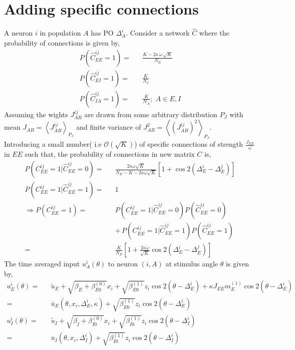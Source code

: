 \documentclass[a4paper]{article}
\date{}
\begin{document}
\section*{Adding specific connections}
A neuron $i$ in population $A$ has PO $\Delta_A^i$. 
Consider a network $\hat{C} $ where the probability of connections is given by, \\
\begin{eqnarray}
P(\hat{C}_{EE}^{ij} = 1) =&& \frac{K - 2 \kappa \, \omega \,  \sqrt{K}}{N_E}  \\
P(\hat{C}_{EI}^{ij} = 1) =&& \frac{K}{N_I} \\
P(\hat{C}_{IA}^{ij} = 1) =&& \frac{K}{N_A}; \,\, A \in {E, I} 
\end{eqnarray}
Assuming the wights $J_{AB}^{ij}$ are drawn from some arbitrary distribution $P_J$ with mean $J_{AB} = \left\langle J_{AB}^{ij} \right\rangle_{P_J}$ and finite variance of $J^2_{AB} = \left\langle \left( J_{AB}^{ij} \right)^2 \right\rangle_{P_J}$. \\
Introducing a small number( i.e $ \mathcal{O} \left( \sqrt{K} \right)$) of specific connections of strength $\frac{J_{EE}}{\omega}$ in $EE$ such that, the probability of connections in new matrix $C$ is,
\begin{eqnarray}
P(C_{EE}^{ij} = 1 | \hat{C}_{EE}^{ij} = 0) =&& \frac{2 \kappa \omega \sqrt{K}}{N_E - K - 2 \kappa \omega \sqrt{K} } \left[ 1 + \cos2(\Delta_E^i - \Delta_E^j) \right] \\
P(C_{EE}^{ij} = 1 | \hat{C}_{EE}^{ij} = 1) =&& 1  \\
\Rightarrow P(C_{EE}^{ij} = 1) =&& P(C_{EE}^{ij} = 1 | \hat{C}_{EE}^{ij} = 0) P(\hat{C}_{EE}^{ij} = 0)\nonumber \\
\quad&&  + \, P(C_{EE}^{ij} = 1 | \hat{C}_{EE}^{ij} = 1) P(\hat{C}_{EE}^{ij} = 1) \\
=&& \frac{K}{N_E} \left[1 + \frac{2 \kappa \omega}{\sqrt{K}} \cos 2(\Delta_E^i - \Delta_E^j) \right]
\end{eqnarray}
The time averaged input $u_A^{i} (\theta)$ to neuron $(i, A)$ at stimulus angle $\theta$ is given by, 
\begin{eqnarray}
u_E^{i} (\theta) =&& \tilde{u}_E + \sqrt{\beta_E + \beta_{E0}^{(0)}} x_i +  \sqrt{\beta_{E0}^{(1)}} z_i \cos 2 (\theta - \Delta_E^i) + \kappa J_{EE} m_E^{(1)} \cos 2 ( \theta  - \Delta_E^i) \\
=&& \overline{u}_E(\theta, x_i, \Delta_E^i, \kappa) +  \sqrt{\beta_{E0}^{(1)}} z_i \cos 2 (\theta - \Delta_E^i) \\
u_I^{i} (\theta) =&& \tilde{u}_I + \sqrt{\beta_I + \beta_{I0}^{(0)}} x_i +  \sqrt{\beta_{I0}^{(1)}} z_i \cos 2 (\theta - \Delta_I^i) \\
=&& \overline{u}_I(\theta, x_i, \Delta_I^i) +  \sqrt{\beta_{I0}^{(1)}} z_i \cos 2 (\theta - \Delta_I^i)
\end{eqnarray}
\end{document}
